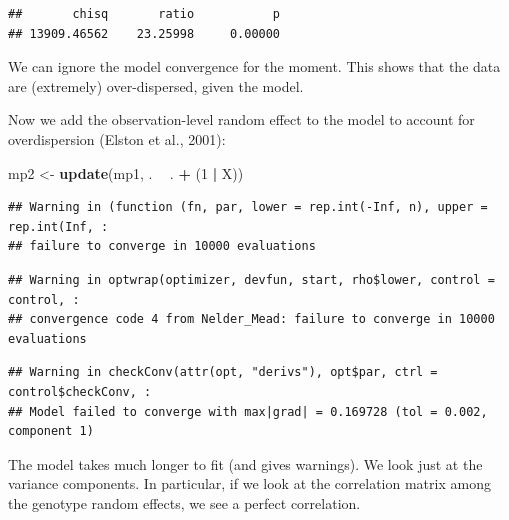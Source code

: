 \documentclass[
  12pt,
]{book}
\newenvironment{Shaded}{\begin{snugshade}}{\end{snugshade}}
\newcommand{\DecValTok}[1]{\textcolor[rgb]{0.00,0.00,0.81}{#1}}
\newcommand{\KeywordTok}[1]{\textcolor[rgb]{0.13,0.29,0.53}{\textbf{#1}}}
\newcommand{\NormalTok}[1]{#1}
\newcommand{\OperatorTok}[1]{\textcolor[rgb]{0.81,0.36,0.00}{\textbf{#1}}}
\newcommand{\StringTok}[1]{\textcolor[rgb]{0.31,0.60,0.02}{#1}}
\begin{document}
\begin{verbatim}
##       chisq       ratio           p 
## 13909.46562    23.25998     0.00000
\end{verbatim}

We can ignore the model convergence for the moment. This shows that the data are (extremely) over-dispersed, given the model.

Now we add the observation-level random effect to the model to account for overdispersion (Elston et al., 2001):

\begin{Shaded}
\begin{Highlighting}[]
\NormalTok{mp2 <-}\StringTok{ }\KeywordTok{update}\NormalTok{(mp1, . }\OperatorTok{~}\StringTok{ }\NormalTok{. }\OperatorTok{+}\StringTok{ }\NormalTok{(}\DecValTok{1} \OperatorTok{|}\StringTok{ }\NormalTok{X))}
\end{Highlighting}
\end{Shaded}

\begin{verbatim}
## Warning in (function (fn, par, lower = rep.int(-Inf, n), upper = rep.int(Inf, :
## failure to converge in 10000 evaluations
\end{verbatim}

\begin{verbatim}
## Warning in optwrap(optimizer, devfun, start, rho$lower, control = control, :
## convergence code 4 from Nelder_Mead: failure to converge in 10000 evaluations
\end{verbatim}

\begin{verbatim}
## Warning in checkConv(attr(opt, "derivs"), opt$par, ctrl = control$checkConv, :
## Model failed to converge with max|grad| = 0.169728 (tol = 0.002, component 1)
\end{verbatim}

The model takes much longer to fit (and gives warnings).
We look just at the variance components. In particular, if we look at the correlation matrix among the genotype random effects, we see a perfect
correlation.

\begin{Shaded}
\end{Shaded}
\end{document}
